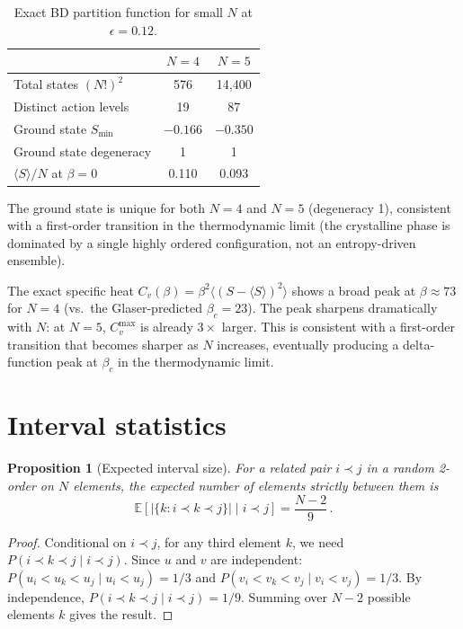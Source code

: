 \documentclass[aps,prd,twocolumn,superscriptaddress,nofootinbib]{revtex4-2}
\newtheorem{proposition}[theorem]{Proposition}
\begin{document}
\begin{table}[h]
\centering
\begin{tabular}{lcc}
\toprule
& $N = 4$ & $N = 5$ \\
\midrule
Total states $(N!)^2$ & 576 & 14,400 \\
Distinct action levels & 19 & 87 \\
Ground state $S_{\min}$ & $-0.166$ & $-0.350$ \\
Ground state degeneracy & 1 & 1 \\
$\langle S \rangle / N$ at $\beta = 0$ & 0.110 & 0.093 \\
\bottomrule
\end{tabular}
\caption{Exact BD partition function for small $N$ at $\epsilon = 0.12$.}
\label{tab:exact_Z}
\end{table}

The ground state is unique for both $N = 4$ and $N = 5$ (degeneracy 1), consistent with a first-order transition in the thermodynamic limit (the crystalline phase is dominated by a single highly ordered configuration, not an entropy-driven ensemble).

The exact specific heat $C_v(\beta) = \beta^2 \langle (S - \langle S \rangle)^2 \rangle$ shows a broad peak at $\beta \approx 73$ for $N = 4$ (vs.\ the Glaser-predicted $\beta_c = 23$). The peak sharpens dramatically with $N$: at $N = 5$, $C_v^{\max}$ is already $3\times$ larger. This is consistent with a first-order transition that becomes sharper as $N$ increases, eventually producing a delta-function peak at $\beta_c$ in the thermodynamic limit.

\section{Interval statistics}

\begin{proposition}[Expected interval size]
For a related pair $i \prec j$ in a random 2-order on $N$ elements, the expected number of elements strictly between them is
\begin{equation}
\mathbb{E}[|\{k : i \prec k \prec j\}| \;\big|\; i \prec j] = \frac{N - 2}{9}\,.
\end{equation}
\end{proposition}

\begin{proof}
Conditional on $i \prec j$, for any third element $k$, we need $P(i \prec k \prec j \mid i \prec j)$. Since $u$ and $v$ are independent: $P(u_i < u_k < u_j \mid u_i < u_j) = 1/3$ and $P(v_i < v_k < v_j \mid v_i < v_j) = 1/3$. By independence, $P(i \prec k \prec j \mid i \prec j) = 1/9$. Summing over $N - 2$ possible elements $k$ gives the result.
\end{proof}
\end{document}
